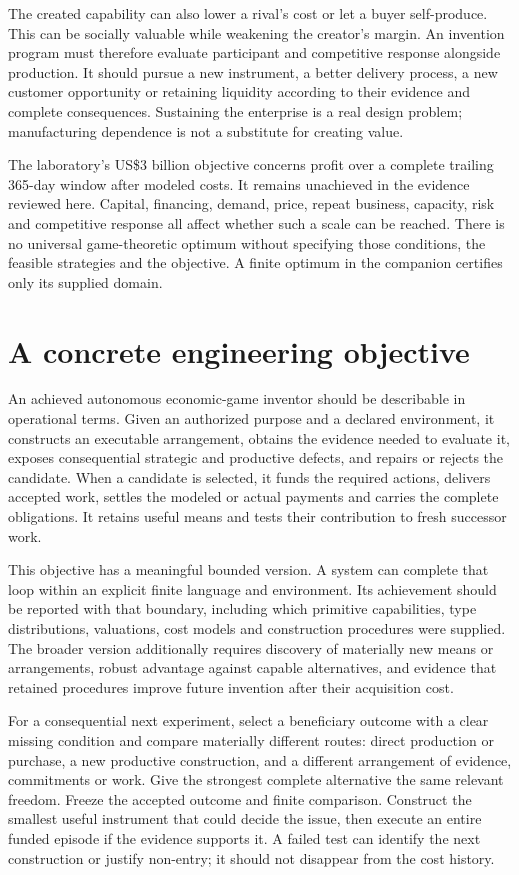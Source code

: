 The created capability can also lower a rival's cost or let a buyer self-produce. This can be socially valuable while weakening the creator's margin. An invention program must therefore evaluate participant and competitive response alongside production. It should pursue a new instrument, a better delivery process, a new customer opportunity or retaining liquidity according to their evidence and complete consequences. Sustaining the enterprise is a real design problem; manufacturing dependence is not a substitute for creating value.

The laboratory's US\$3 billion objective concerns profit over a complete trailing 365-day window after modeled costs. It remains unachieved in the evidence reviewed here. Capital, financing, demand, price, repeat business, capacity, risk and competitive response all affect whether such a scale can be reached. There is no universal game-theoretic optimum without specifying those conditions, the feasible strategies and the objective. A finite optimum in the companion certifies only its supplied domain.

\section{A concrete engineering objective}\label{sec:objective}
An achieved autonomous economic-game inventor should be describable in operational terms. Given an authorized purpose and a declared environment, it constructs an executable arrangement, obtains the evidence needed to evaluate it, exposes consequential strategic and productive defects, and repairs or rejects the candidate. When a candidate is selected, it funds the required actions, delivers accepted work, settles the modeled or actual payments and carries the complete obligations. It retains useful means and tests their contribution to fresh successor work.

This objective has a meaningful bounded version. A system can complete that loop within an explicit finite language and environment. Its achievement should be reported with that boundary, including which primitive capabilities, type distributions, valuations, cost models and construction procedures were supplied. The broader version additionally requires discovery of materially new means or arrangements, robust advantage against capable alternatives, and evidence that retained procedures improve future invention after their acquisition cost.

For a consequential next experiment, select a beneficiary outcome with a clear missing condition and compare materially different routes: direct production or purchase, a new productive construction, and a different arrangement of evidence, commitments or work. Give the strongest complete alternative the same relevant freedom. Freeze the accepted outcome and finite comparison. Construct the smallest useful instrument that could decide the issue, then execute an entire funded episode if the evidence supports it. A failed test can identify the next construction or justify non-entry; it should not disappear from the cost history.

